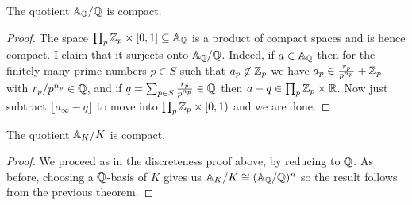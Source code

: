 \begin{theorem}
  \label{Rat.AdeleRing.cocompact}
  \leanok
  The quotient $\mathbb{A}_{\mathbb{Q}}/\mathbb{Q}$ is compact.
\end{theorem}
\begin{proof}
  The space $\prod_p\mathbb{Z}_p\times[0,1]\subseteq\mathbb{A}_{\mathbb{Q}}$ is a product of compact spaces
  and is hence compact. I claim that it surjects onto $\mathbb{A}_{\mathbb{Q}}/\mathbb{Q}$. Indeed,
  if $a\in\mathbb{A}_{\mathbb{Q}}$ then for the finitely many prime numbers $p\in S$ such that $a_p\not\in\mathbb{Z}_p$
  we have $a_p\in\frac{r_p}{p^{n_p}}+\mathbb{Z}_p$ with $r_p/p^{n_p}\in\mathbb{Q}$, and
  if $q=\sum_{p\in S}\frac{r_p}{p^{n_p}}\in\mathbb{Q}$ then $a-q\in \prod_p\mathbb{Z}_p\times\mathbb{R}$.
  Now just subtract $\lfloor a_{\infty}-q\rfloor$ to move into $\prod_p\mathbb{Z}_p\times[0,1)$
  and we are done.
\end{proof}

\begin{theorem}
  \label{NumberField.AdeleRing.cocompact}
  \leanok
  The quotient $\mathbb{A}_K/K$ is compact.
\end{theorem}
\begin{proof}
  We proceed as in the discreteness proof above, by reducing to $\mathbb{Q}$. As before, choosing
  a $\mathbb{Q}$-basis of $K$ gives us $\mathbb{A}_K/K\cong(\mathbb{A}_{\mathbb{Q}}/\mathbb{Q})^n$ so the result follows from
  the previous theorem.
\end{proof}
